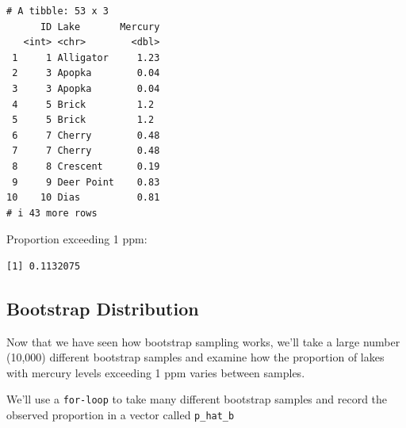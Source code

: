 \documentclass[
  letterpaper,
  DIV=11,
  numbers=noendperiod]{scrreprt}
\newenvironment{Shaded}{\begin{snugshade}}{\end{snugshade}}
\newcommand{\DecValTok}[1]{\textcolor[rgb]{0.68,0.00,0.00}{#1}}
\newcommand{\FunctionTok}[1]{\textcolor[rgb]{0.28,0.35,0.67}{#1}}
\newcommand{\NormalTok}[1]{\textcolor[rgb]{0.00,0.23,0.31}{#1}}
\newcommand{\SpecialCharTok}[1]{\textcolor[rgb]{0.37,0.37,0.37}{#1}}
\begin{document}
\begin{verbatim}
# A tibble: 53 x 3
      ID Lake       Mercury
   <int> <chr>        <dbl>
 1     1 Alligator     1.23
 2     3 Apopka        0.04
 3     3 Apopka        0.04
 4     5 Brick         1.2 
 5     5 Brick         1.2 
 6     7 Cherry        0.48
 7     7 Cherry        0.48
 8     8 Crescent      0.19
 9     9 Deer Point    0.83
10    10 Dias          0.81
# i 43 more rows
\end{verbatim}

Proportion exceeding 1 ppm:

\begin{Shaded}
\end{Shaded}

\begin{verbatim}
[1] 0.1132075
\end{verbatim}

\subsection{Bootstrap Distribution}\label{bootstrap-distribution}

Now that we have seen how bootstrap sampling works, we'll take a large
number (10,000) different bootstrap samples and examine how the
proportion of lakes with mercury levels exceeding 1 ppm varies between
samples.

We'll use a \texttt{for-loop} to take many different bootstrap samples
and record the observed proportion in a vector called \texttt{p\_hat\_b}
\end{document}
